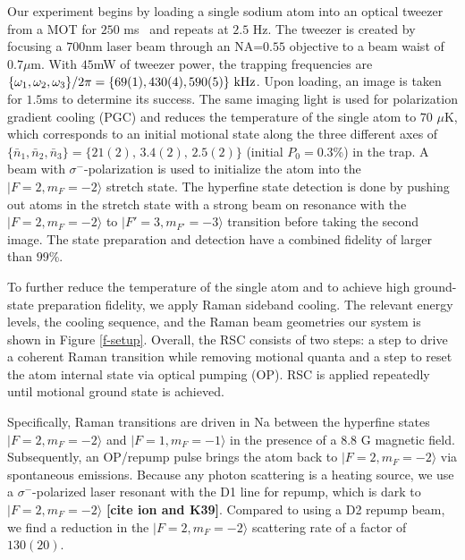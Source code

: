 \documentclass[aps,prl,twocolumn,groupedaddress]{revtex4-1}
\newcommand{\fxnote}[1]{{\textbf{[#1]}}}
\begin{document}
Our experiment begins by loading a single sodium atom into an optical tweezer from a MOT
for $250$ ms~\cite{Hutzler2017-LightShifts} and repeats at $2.5$ Hz.
The tweezer is created by focusing a $700$nm laser beam through an NA=$0.55$ objective to
a beam waist of $0.7 \mu$m.
With $45$mW of tweezer power, the trapping frequencies are
$\{\omega_1,\omega_2,\omega_3\}/2\pi = \{69(1), 430(4), 590(5)\}\ \text{\text{kHz}}$.
Upon loading, an image is taken for $1.5$ms to determine its success.
The same imaging light is used for polarization gradient cooling (PGC) and
reduces the temperature of the single atom to $70$ $\mu$K,
which corresponds to an initial motional state along the three different axes of
$\{\bar n_1, \bar n_2, \bar n_3\}=\{21(2),\, 3.4(2),\, 2.5(2)\}$ (initial $P_0=0.3$\%) in the trap.
A beam with $\sigma^-$-polarization is used to initialize the atom into
the $|F=2, m_F=-2\rangle$ stretch state.
The hyperfine state detection is done by pushing out atoms in the stretch state with a strong
beam on resonance with the $|F=2, m_F=-2\rangle$ to $|F'=3, m_{F'}=-3\rangle$ transition before
taking the second image.
The state preparation and detection have a combined fidelity of larger than $99$\%.

To further reduce the temperature of the single atom and
to achieve high ground-state preparation fidelity, we apply Raman sideband cooling.
The relevant energy levels, the cooling sequence, and the Raman beam geometries our system
is shown in Figure \ref{f-setup}. Overall, the RSC consists of two steps:
a step to drive a coherent Raman transition while removing motional quanta and
a step to reset the atom internal state via optical pumping (OP).
RSC is applied repeatedly until motional ground state is achieved.

Specifically, Raman transitions are driven in Na between the hyperfine states
$|F=2, m_F=-2\rangle$ and  $|F=1, m_F=-1\rangle$ in the presence of a $8.8$ G magnetic field.
Subsequently, an OP/repump pulse brings the atom back to $|F=2, m_F=-2\rangle$
via spontaneous emissions.
Because any photon scattering is a heating source,
we use a $\sigma^-$-polarized laser resonant with the D1 line for repump,
which is dark to $|F=2, m_F=-2\rangle$ \fxnote{cite ion and K39}.
Compared to using a D2 repump beam, we find a reduction in the $|F=2, m_F=-2\rangle$
scattering rate of a factor of $130(20)$.
\end{document}
